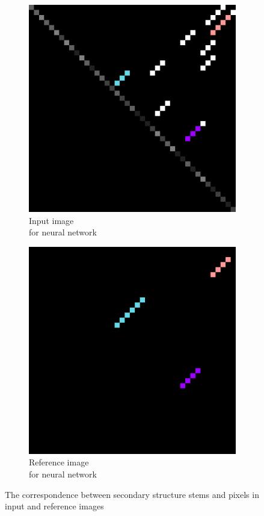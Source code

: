\documentclass[runningheads]{llncs}
\begin{document}
\begin{figure}[h]
\begin{subfigure}{.33\textwidth}
  \hbox{\includegraphics[width=\linewidth]{pics/in.png}}
  \caption{Input image \\ for neural network}
  \label{struc_b}
\end{subfigure}
\begin{subfigure}{.33\textwidth}
  \centering
  \hbox{\includegraphics[width=\linewidth]{pics/out.png}}
  \caption{Reference image \\ for neural network}
  \label{struc_c}
\end{subfigure}
\caption{The correspondence between secondary structure stems and pixels in input and reference images}
\label{struc}
\end{figure}
\end{document}
